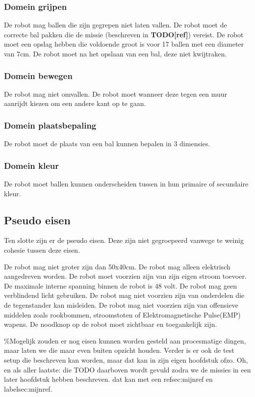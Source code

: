 \documentclass[12pt]{article} %
\begin{document}
\subsubsection*{Domein grijpen}
\begin{enumerate}
 De robot mag ballen die zijn gegrepen niet laten vallen.
 De robot moet de correcte bal pakken die de missie (beschreven in \textbf{TODO[ref]}) vereist.
 De robot moet een opslag hebben die voldoende groot is voor 17 ballen met een diameter van 7cm.
 De robot moet na het opslaan van een bal, deze niet kwijtraken.
\subsubsection*{Domein bewegen}
 De robot mag niet omvallen.
 De robot moet wanneer deze tegen een muur aanrijdt kiezen om een andere kant op te gaan.
\subsubsection*{Domein plaatsbepaling}
 De robot moet de plaats van een bal kunnen bepalen in 3 dimensies.
\subsubsection*{Domein kleur}
 De robot moet ballen kunnen onderscheiden tussen in hun primaire of secundaire kleur.

\end{enumerate}
\subsection{Pseudo eisen}
Ten slotte zijn er de pseudo eisen. Deze zijn niet gegroepeerd vanwege te weinig cohesie tussen deze eisen.
\begin{enumerate}
 De robot mag niet groter zijn dan 50x40cm.
 De robot mag alleen elektrisch aangedreven worden.
 De robot moet voorzien zijn van zijn eigen stroom toevoer.
 De maximale interne spanning binnen de robot is 48 volt.
 De robot mag geen verblindend licht gebruiken.
 De robot mag niet voorzien zijn van onderdelen die de tegenstander kan misleiden.
 De robot mag niet voorzien zijn van offensieve middelen zoals rookbommen, stroomstoten of Elektromagnetische Pulse(EMP) wapens.
 De noodknop op de robot moet zichtbaar en toegankelijk zijn. 
\end{enumerate}
\newpage
\%Mogelijk zouden er nog eisen kunnen worden gesteld aan procesmatige dingen, maar laten we die maar even buiten opzicht houden. Verder is er ook de test setup die beschreven kan worden, maar dat kan in zijn eigen hoofdstuk ofzo. Oh, en als aller laatste: die TODO daarboven wordt gevuld zodra we de missies in een later hoofdstuk hebben beschreven. dat kan met een ref{sec:mijnref} en label{sec:mijnref}. 
\end{document}
